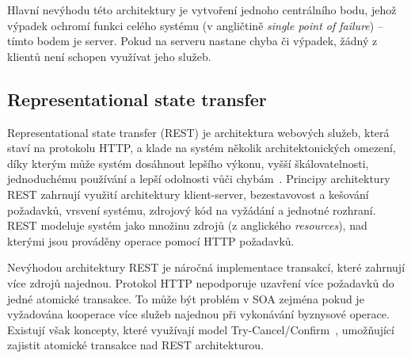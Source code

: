 Hlavní nevýhodu této architektury je vytvoření jednoho centrálního bodu,
jehož výpadek ochromí funkci celého systému (v angličtině
\textit{single point of failure}) -- tímto bodem je server.
Pokud na serveru nastane chyba či výpadek, žádný z klientů není schopen využívat
jeho služeb.

%



\subsection{Representational state transfer}\label{sec:rest}

Representational state transfer (\gls{REST}) je architektura
webových služeb, která staví na protokolu \gls{HTTP}, a klade na systém
několik architektonických omezení, díky kterým může systém dosáhnout
lepšího výkonu, vyšší škálovatelnosti, jednoduchému používání
a lepší odolnosti vůči chybám~\cite{fielding2000rest}. Principy architektury
\gls{REST} zahrnují využití architektury klient-server, bezestavovost a kešování požadavků,
vrsvení systému, zdrojový kód na vyžádání a jednotné rozhraní.
\gls{REST} modeluje systém jako množinu zdrojů (z anglického \textit{resources}),
nad kterými jsou prováděny operace pomocí \gls{HTTP} požadavků.

Nevýhodou architektury \gls{REST} je náročná implementace transakcí, které zahrnují více
zdrojů najednou. Protokol \gls{HTTP} nepodporuje uzavření více požadavků do jedné atomické
transakce. To může být problém v \gls{SOA} zejména pokud je vyžadována kooperace více služeb
najednou při vykonávání byznysové operace. Existují však koncepty, které využívají model
Try-Cancel/Confirm~\cite{pardon2011towards}, umožňující zajistit atomické transakce nad
\gls{REST} architekturou.

